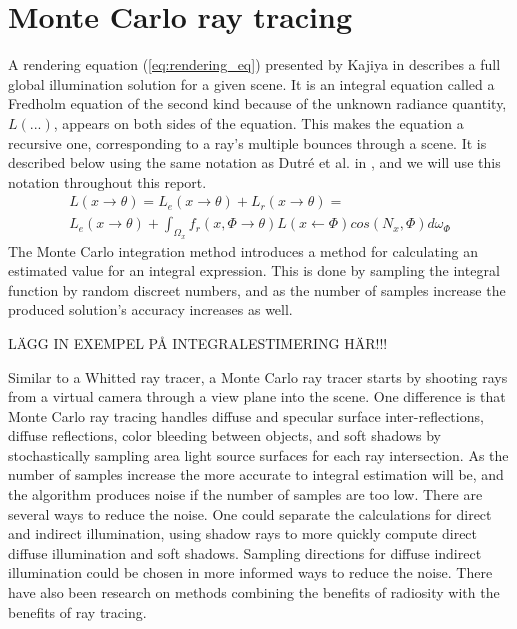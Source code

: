 \documentclass[]{report}   %
\begin{document}
\section{Monte Carlo ray tracing}
A rendering equation (\ref{eq:rendering_eq}) presented by Kajiya in \cite{kajiya} describes a full global illumination solution for a given scene. It is an integral equation called a Fredholm equation of the second kind because of the unknown radiance quantity, $L(...)$, appears on both sides of the equation. This makes the equation a recursive one, corresponding to a ray's multiple bounces through a scene. It is described below using the same notation as Dutr\'{e} et al. in \cite{dutre}, and we will use this notation throughout this report.
\begin{equation}
\label{eq:rendering_eq}
\begin{split}
L(x \rightarrow \theta) = L_e(x \rightarrow \theta) + L_r(x \rightarrow \theta) =\\ 
L_e(x \rightarrow \theta) + \int_{\Omega_x} f_r(x, \Phi \rightarrow \theta)L(x \leftarrow \Phi)cos(N_x, \Phi)d\omega_{\Phi}
\end{split}
\end{equation}
The Monte Carlo integration method introduces a method for calculating an estimated value for an integral expression. This is done by sampling the integral function by random discreet numbers, and as the number of samples increase the produced solution's accuracy increases as well.

LÄGG IN EXEMPEL PÅ INTEGRALESTIMERING HÄR!!!

Similar to a Whitted ray tracer, a Monte Carlo ray tracer starts by shooting rays from a virtual camera through a view plane into the scene. One difference is that Monte Carlo ray tracing handles diffuse and specular surface inter-reflections, diffuse reflections, color bleeding between objects, and soft shadows by stochastically sampling area light source surfaces for each ray intersection. As the number of samples increase the more accurate to integral estimation will be, and the algorithm produces noise if the number of samples are too low. There are several ways to reduce the noise. One could separate the calculations for direct and indirect illumination, using shadow rays to more quickly compute direct diffuse illumination and soft shadows. Sampling directions for diffuse indirect illumination could be chosen in more informed ways to reduce the noise. There have also been research on methods combining the benefits of radiosity with the benefits of ray tracing.
\end{document}
